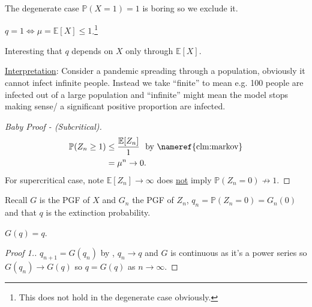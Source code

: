 \color{blue} The degenerate case $\mathbb{P}(X = 1) = 1$ is boring so we exclude it. \color{black}

\begin{theorem}
    $q = 1 \iff \mu = \mathbb{E}[X] \leq 1$.\footnote{This does not hold in the degenerate case obviously.}
\end{theorem} 

\begin{remark} \color{blue} 
    Interesting that $q$ depends on $X$ only through $\mathbb{E}[X]$.
\end{remark} 

\underline{Interpretation}: Consider a pandemic spreading through a population, obviously it cannot infect infinite people.
Instead we take ``finite'' to mean e.g. 100 people are infected out of a large population and ``infinite'' might mean the model stops making sense/ a significant positive proportion are infected.

\begin{proof}[Baby Proof - (Subcritical)]
    \begin{align*}
        \mathbb{P}(Z_n \geq 1) &\leq \frac{\mathbb{E}[Z_n]}{1} \ \text{ by \nameref{clm:markov}} \\
        &= \mu^n \to 0.
    \end{align*} 
    For supercritical case, \color{red} note $\mathbb{E}[Z_n] \to \infty$ does \underline{not} imply $\mathbb{P}(Z_n = 0) \not\to 1$.
\end{proof} 

Recall $G$ is the PGF of $X$ and $G_n$ the PGF of $Z_n$, $q_n = \mathbb{P}(Z_n = 0) = G_n(0)$ and that $q$ is the extinction probability.

\begin{claim} \label{clm:branchpgf}
    $G(q) = q$.
\end{claim}

\begin{proof}[Proof 1.]
    $q_{n+1} = G(q_n)$ by , $q_n \to q$ and $G$ is continuous as it's a power series so $G(q_n) \to G(q)$ so $q = G(q)$ as $n \to \infty$.
\end{proof}

